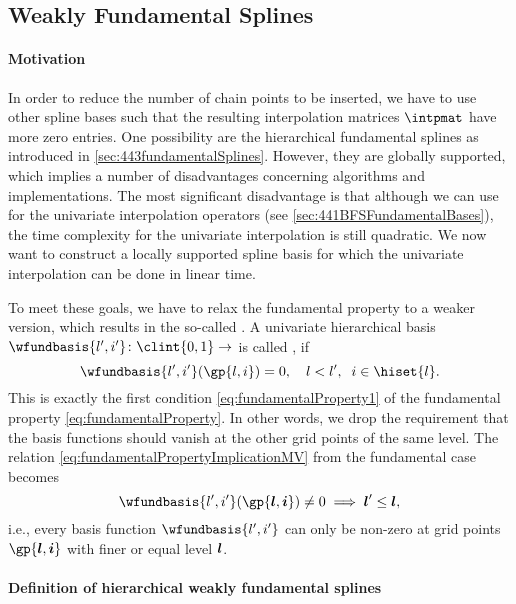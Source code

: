 \subsection{Weakly Fundamental Splines}
\label{sec:454wfs}

\paragraph{Motivation}

In order to reduce the number of chain points to be inserted,
we have to use other spline bases such that
the resulting interpolation matrices $\intpmat$ have more zero entries.
One possibility are the hierarchical fundamental splines
as introduced in \cref{sec:443fundamentalSplines}.
However, they are globally supported, which implies a number
of disadvantages concerning algorithms and implementations.
The most significant disadvantage is that although
we can use \bfs for the univariate interpolation operators
(see \cref{sec:441BFSFundamentalBases}),
the time complexity for the univariate interpolation is still quadratic.
We now want to construct a locally supported spline basis for which
the univariate interpolation can be done in linear time.

To meet these goals, we have to relax the fundamental property
to a weaker version, which results in the so-called
.
A univariate hierarchical basis
$\wfundbasis{l',i'}\colon \clint{0, 1} \to \real$
is called , if
\begin{equation}
  \label{eq:weaklyFundamentalProperty}
  \wfundbasis{l',i'}(\gp{l,i}) = 0,\quad
  l < l',\;\;
  i \in \hiset{l}.
\end{equation}
This is exactly the first condition \eqref{eq:fundamentalProperty1}
of the fundamental property \eqref{eq:fundamentalProperty}.
In other words, we drop the requirement that the basis functions
should vanish at the other grid points of the same level.
The relation \eqref{eq:fundamentalPropertyImplicationMV} from the
fundamental case becomes
\begin{equation}
  \label{eq:weaklyFundamentalPropertyImplicationMV}
  \wfundbasis{l',i'}(\gp{\*l,\*i})
  \not= 0
  \implies
  \*l' \le \*l,
\end{equation}
i.e., every basis function $\wfundbasis{l',i'}$
can only be non-zero at grid points $\gp{\*l,\*i}$ with
finer or equal level ${\boldsymbol{l}}$.

\paragraph{Definition of hierarchical weakly fundamental splines}

